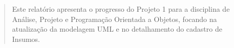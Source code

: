 \documentclass[12pt,a4paper]{article}
\begin{document}
\maketitle

\begin{abstract}
  Este relatório apresenta o progresso do Projeto 1 para a disciplina
  de Análise, Projeto e Programação Orientada a Objetos, focando na
  atualização da modelagem UML e no detalhamento do cadastro de Insumos.
\end{abstract}

\tableofcontents
\newpage


\end{document}
